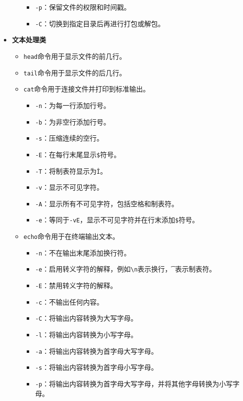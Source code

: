 \documentclass[../main.tex]{subfiles}
\begin{document}
\begin{itemize}
\begin{itemize}
\begin{itemize}
      \item \texttt{-p}：保留文件的权限和时间戳。
      \item \texttt{-C}：切换到指定目录后再进行打包或解包。
    \end{itemize}
  \end{itemize}
  \item \textbf{文本处理类}
  \begin{itemize}
    \item \texttt{head}命令用于显示文件的前几行。
    \item \texttt{tail}命令用于显示文件的后几行。
    \item \texttt{cat}命令用于连接文件并打印到标准输出。
    \begin{itemize}
      \item \texttt{-n}：为每一行添加行号。
      \item \texttt{-b}：为非空行添加行号。
      \item \texttt{-s}：压缩连续的空行。
      \item \texttt{-E}：在每行末尾显示\texttt{\$}符号。
      \item \texttt{-T}：将制表符显示为\texttt{\^I}。
      \item \texttt{-v}：显示不可见字符。
      \item \texttt{-A}：显示所有不可见字符，包括空格和制表符。
      \item \texttt{-e}：等同于\texttt{-vE}，显示不可见字符并在行末添加\texttt{\$}符号。
    \end{itemize}
    \item \texttt{echo}命令用于在终端输出文本。
    \begin{itemize}
      \item \texttt{-n}：不在输出末尾添加换行符。
      \item \texttt{-e}：启用转义字符的解释，例如\texttt{\textbackslash n}表示换行，\texttt{\t}表示制表符。
      \item \texttt{-E}：禁用转义字符的解释。
      \item \texttt{-c}：不输出任何内容。
      \item \texttt{-C}：将输出内容转换为大写字母。
      \item \texttt{-l}：将输出内容转换为小写字母。
      \item \texttt{-a}：将输出内容转换为首字母大写字母。
      \item \texttt{-s}：将输出内容转换为首字母小写字母。
      \item \texttt{-p}：将输出内容转换为首字母大写字母，并将其他字母转换为小写字母。
    \end{itemize}
  \end{itemize}
\end{itemize}
\end{document}
